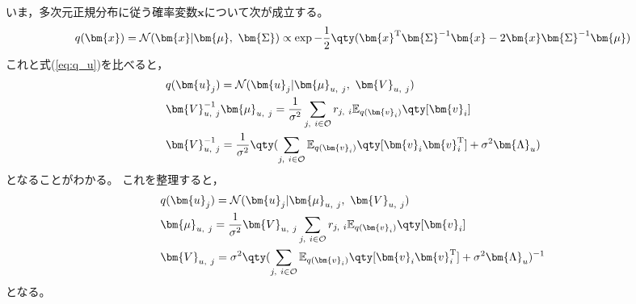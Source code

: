 \documentclass[class=jsarticle, crop=false, dvipdfmx, fleqn]{standalone}
\begin{document}
いま，多次元正規分布に従う確率変数\(\bm{x}\)について次が成立する。
\begin{equation}
    q(\bm{x})
        = \mathcal{N}(\bm{x} | \bm{\mu},\ \bm{\Sigma})
        \propto \exp{-\frac{1}{2} \qty(\bm{x}^\mathrm{T} \bm{\Sigma}^{-1} \bm{x} - 2\bm{x} \bm{\Sigma}^{-1} \bm{\mu})}
    \label{eq:multi_normal}
\end{equation}
これと式(\ref{eq:q_u})を比べると，
\begin{align}
    & q(\bm{u}_j) = \mathcal{N}(\bm{u}_j | \bm{\mu}_{u,\ j},\ \bm{V}_{u,\ j}) \\
    & \bm{V}_{u,\ j}^{-1} \bm{\mu}_{u,\ j} = \frac{1}{\sigma^2} \sum_{j,\ i \in \mathcal{O}} r_{j,\ i} \mathbb{E}_{q(\bm{v}_i)} \qty[\bm{v}_i] \\
    & \bm{V}_{u,\ j}^{-1} = \frac{1}{\sigma^2} \qty(\sum_{j,\ i \in \mathcal{O}} \mathbb{E}_{q(\bm{v}_i)} \qty[\bm{v}_i \bm{v}_i^\mathrm{T}] + \sigma^2 \bm{\Lambda}_u)
\end{align}
となることがわかる。
これを整理すると，
\begin{align}
    & q(\bm{u}_j) = \mathcal{N}(\bm{u}_j | \bm{\mu}_{u,\ j},\ \bm{V}_{u,\ j}) \\
    & \bm{\mu}_{u,\ j} = \frac{1}{\sigma^2} \bm{V}_{u,\ j} \sum_{j,\ i \in \mathcal{O}} r_{j,\ i} \mathbb{E}_{q(\bm{v}_i)} \qty[\bm{v}_i] \\
    & \bm{V}_{u,\ j} = \sigma^2 \qty(\sum_{j,\ i \in \mathcal{O}} \mathbb{E}_{q(\bm{v}_i)} \qty[\bm{v}_i \bm{v}_i^\mathrm{T}] + \sigma^2 \bm{\Lambda}_u)^{-1}
\end{align}
となる。
\end{document}

